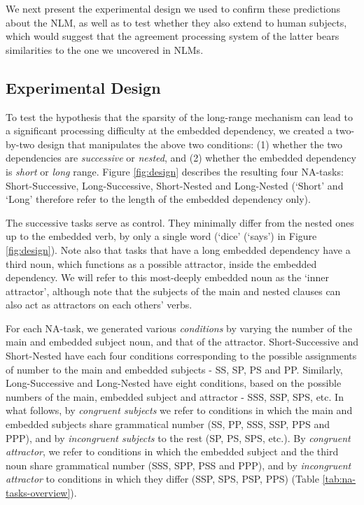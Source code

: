 We next present the experimental design we used to confirm these predictions about the NLM, as well as to test whether they also extend to human subjects, which would suggest that the agreement processing system of the latter bears similarities to the one we uncovered in NLMs.

\subsection{Experimental Design}
To test the hypothesis that the sparsity of the long-range mechanism can lead to a significant processing difficulty at the embedded dependency, we created a two-by-two design that manipulates the above two conditions: (1) whether the two dependencies are \textit{successive} or \textit{nested}, and (2) whether the embedded dependency is \textit{short} or \textit{long} range. 
Figure \ref{fig:design} describes the resulting four NA-tasks: Short-Successive, Long-Successive, Short-Nested and Long-Nested (`Short' and `Long' therefore refer to the length of the embedded dependency only). 

The successive tasks serve as control. They minimally differ from the nested ones up to the embedded verb, by only a single word (`dice' (`says') in Figure \ref{fig:design}). Note also that tasks that have a long embedded dependency have a third noun, which functions as a possible attractor, inside the embedded dependency. We will refer to this most-deeply embedded noun as the `inner attractor', although note that the subjects of the main and nested clauses can also act as attractors on each others' verbs.

For each NA-task, we generated various \textit{conditions} by varying the number of the main and embedded subject noun, and that of the attractor. Short-Successive and Short-Nested have each four conditions corresponding to the possible assignments of number to the main and embedded subjects - SS, SP, PS and PP. Similarly, Long-Successive and Long-Nested have eight conditions, based on the possible numbers of the main, embedded subject and attractor - SSS, SSP, SPS, etc. In what follows, by \textit{congruent subjects} we refer to conditions in which the main and embedded subjects share grammatical number (SS, PP, SSS, SSP, PPS and PPP), and by \textit{incongruent subjects} to the rest (SP, PS, SPS, etc.). By \textit{congruent attractor}, we refer to conditions in which the embedded subject and the third noun share grammatical number (SSS, SPP, PSS and PPP), and by \textit{incongruent attractor} to conditions in which they differ (SSP, SPS, PSP, PPS) (Table \ref{tab:na-tasks-overview}).

